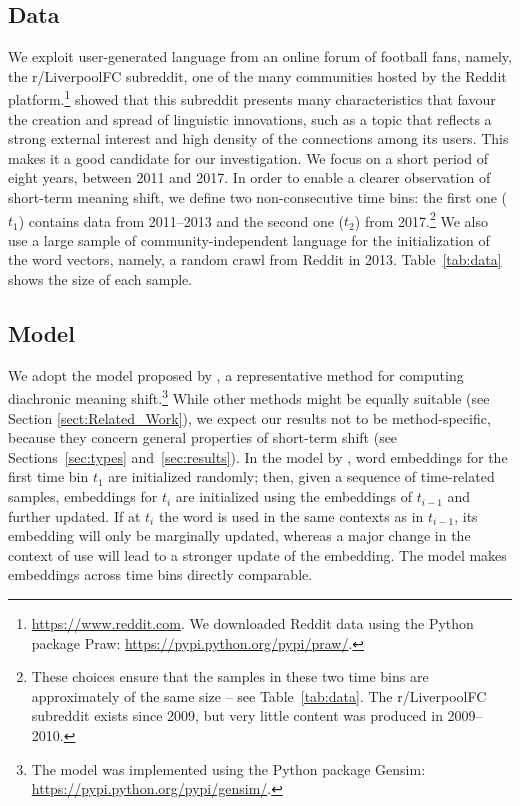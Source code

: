 \subsection{Data}
\label{subsec:Data}
We exploit user-generated language from an online forum of football fans,
namely, the r/LiverpoolFC subreddit, one of the many communities hosted
by the Reddit platform.\footnote{\url{https://www.reddit.com}. We downloaded Reddit data using the Python package Praw: \url{https://pypi.python.org/pypi/praw/}.}
 showed that this subreddit presents many characteristics that favour the creation and spread of linguistic innovations, such as a topic that reflects a strong external interest and high density of the connections among its users. This makes it a good candidate for our investigation.
We focus on a short period of eight years, between 2011 and 2017. 
In order to enable a clearer observation of short-term meaning shift, we define two
non-consecutive time bins: the first one ($t_1$) contains data from
2011--2013 and the second one ($t_2$) from 2017.\footnote{These choices
  ensure that the samples in these two time bins are approximately of the same size -- see Table~\ref{tab:data}. The
  r/LiverpoolFC subreddit exists since 2009, but very little content
  was produced in 2009--2010.}
 We also use a large sample of community-independent language for the
initialization of the word vectors, namely, a random crawl from Reddit
in 2013.
Table~\ref{tab:data} shows the size of each sample.

\subsection{Model}
\label{subsec:Model}
We adopt the model proposed by , a representative method for computing diachronic meaning shift.\footnote{The model was implemented using the Python package Gensim: \url{https://pypi.python.org/pypi/gensim/}.} While other methods might be equally suitable (see Section \ref{sect:Related_Work}), we expect our results not to be method-specific, because they concern general properties of short-term shift (see Sections~\ref{sec:types} and~\ref{sec:results}).
In the model by , word
embeddings for the first time bin $t_1$ are initialized randomly; then,
given a sequence of time-related samples, embeddings for $t_i$
are initialized using the embeddings of $t_{i-1}$ and further
updated. 
If at $t_i$ the word is used in the same contexts as in $t_{i-1}$, its embedding will only be marginally updated, whereas a major change in the context of use will lead to a stronger update of the embedding. The model makes embeddings across time bins directly comparable.

